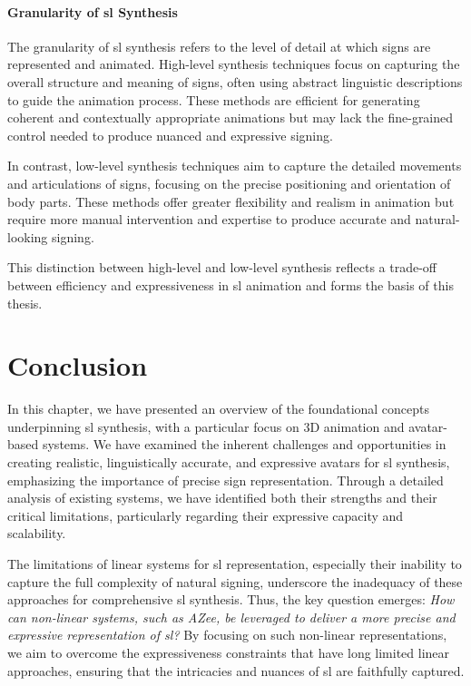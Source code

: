 \documentclass[../../main.tex]{subfiles}
\begin{document}
\paragraph{Granularity of \gls{sl} Synthesis}
\label{ch:background_work:sign_language_synthesis:3d_techniques:sign_language_synthesis_systems:granularity_of_sl_synthesis}

The granularity of \gls{sl} synthesis refers to the level of detail at which signs are represented and animated. High-level synthesis techniques focus on capturing the overall structure and meaning of signs, often using abstract linguistic descriptions to guide the animation process. These methods are efficient for generating coherent and contextually appropriate animations but may lack the fine-grained control needed to produce nuanced and expressive signing.

In contrast, low-level synthesis techniques aim to capture the detailed movements and articulations of signs, focusing on the precise positioning and orientation of body parts. These methods offer greater flexibility and realism in animation but require more manual intervention and expertise to produce accurate and natural-looking signing.

This distinction between high-level and low-level synthesis reflects a trade-off between efficiency and expressiveness in \gls{sl} animation and forms the basis of this thesis.

\section{Conclusion}
\label{ch:background_work:conclusion}

In this chapter, we have presented an overview of the foundational concepts underpinning \gls{sl} synthesis, with a particular focus on 3D animation and avatar-based systems. We have examined the inherent challenges and opportunities in creating realistic, linguistically accurate, and expressive avatars for \gls{sl} synthesis, emphasizing the importance of precise sign representation. Through a detailed analysis of existing systems, we have identified both their strengths and their critical limitations, particularly regarding their expressive capacity and scalability.

The limitations of linear systems for \gls{sl} representation, especially their inability to capture the full complexity of natural signing, underscore the inadequacy of these approaches for comprehensive \gls{sl} synthesis. Thus, the key question emerges: \textit{How can non-linear systems, such as AZee, be leveraged to deliver a more precise and expressive representation of \gls{sl}?} By focusing on such non-linear representations, we aim to overcome the expressiveness constraints that have long limited linear approaches, ensuring that the intricacies and nuances of \gls{sl} are faithfully captured.
\end{document}
